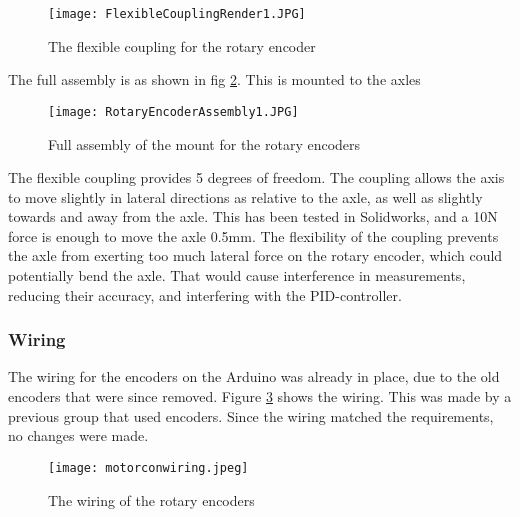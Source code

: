 \begin{figure}[H]
\centering
\texttt{[image: FlexibleCouplingRender1.JPG]}
\caption{The flexible coupling for the rotary encoder}
\label{fig::FCR}
\end{figure}

The full assembly is as shown in fig \ref{fig::REA}.
This is mounted to the axles 

\begin{figure}[H]
\centering
\texttt{[image: RotaryEncoderAssembly1.JPG]}
\caption{Full assembly of the mount for the rotary encoders}
\label{fig::REA}
\end{figure}

The flexible coupling provides 5 degrees of freedom.
The coupling allows the axis to move slightly in lateral directions as relative to the axle, as well as slightly towards and away from the axle.
This has been tested in Solidworks, and a 10N force is enough to move the axle 0.5mm.
The flexibility of the coupling prevents the axle from exerting too much lateral force on the rotary encoder, which could potentially bend the axle.
That would cause interference in measurements, reducing their accuracy, and interfering with the PID-controller.

\subsubsection{Wiring}
The wiring for the encoders on the Arduino was already in place, due to the old encoders that were since removed.
Figure \ref{fig::WD} shows the wiring.
This was made by a previous group that used encoders.
Since the wiring matched the requirements, no changes were made.

\begin{figure}[H]
\centering
\texttt{[image: motorconwiring.jpeg]}
\caption{The wiring of the rotary encoders}
\label{fig::WD}
\end{figure}

\newpage
